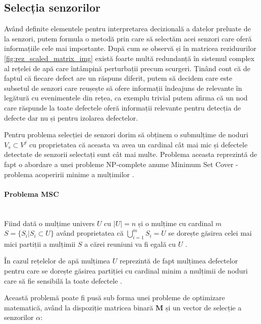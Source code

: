 \subsection{Selecția senzorilor}

Având definite elementele pentru interpretarea decizională a datelor preluate de la senzori, putem formula o metodă prin care să selectăm acei senzori care oferă informațiile cele mai importante. După cum se observă și în matricea reziduurilor \ref{fig:rez_scaled_matrix_img} există foarte multă redundanță în sistemul complex al rețelei de apă care întâmpină perturbații precum scurgeri. Ținând cont că de faptul că fiecare defect are un răspuns diferit, putem să decidem care este subsetul de senzori care reușește să ofere informații îndeajuns de relevante în legătură cu evenimentele din rețea, ca exemplu trivial putem afirma că un nod care răspunde la toate defectele oferă informații relevante pentru detecția de defecte dar nu și pentru izolarea defectelor.

Pentru problema selecției de senzori dorim să obținem o submulțime de noduri $V_s \subset V^j$ cu proprietatea că aceasta va avea un cardinal cât mai mic și defectele detectate de senzorii selectați sunt cât mai multe. Problema aceasta reprezintă de fapt o abordare a unei probleme NP-complete anume Minimum Set Cover - problema acoperirii minime a mulțimilor \cite{perelman2016sensor}.

\paragraph{Problema MSC} \mbox{} \\
Fiind dată o mulțime univers $U$ cu $|U| = n$ și o mulțime cu cardinal $m$ $S = \{S_i | S_i \subset U\}$ având proprietatea că  $\bigcup\limits_{i=1}^{m} S_{i} = U$ se dorește găsirea celei mai mici partiții a mulțimii $S$ a cărei reuniuni va fi egală cu $U$ \cite{CLRS}. 

În cazul rețelelor de apă mulțimea $U$ reprezintă de fapt mulțimea defectelor pentru care se dorește găsirea partiției cu cardinal minim a mulțimii de noduri care să fie sensibilă la toate defectele \cite{perelman2016sensor}.

Această problemă poate fi pusă sub forma unei probleme de optimizare matematică, având la dispoziție matricea binară $\mathbf{M}$ și un vector de selecție a senzorilor $\alpha$:


